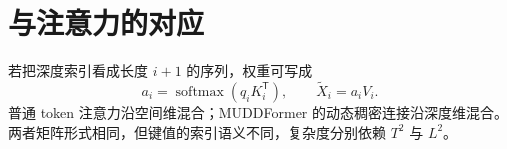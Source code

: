 \documentclass[11pt]{article}
\numberwithin{equation}{section}
\newcommand{\1}{\mathbf{1}}
\newcommand{\T}{\mathsf{T}}
\newcommand{\softmax}{\operatorname{softmax}}
\begin{document}
\section{与注意力的对应}
若把深度索引看成长度 $i+1$ 的序列，权重可写成
\begin{equation}
  a_i=\softmax(q_iK_i^{\T}),\qquad
  \tilde X_i=a_iV_i.
\end{equation}
普通 token 注意力沿空间维混合；MUDDFormer 的动态稠密连接沿深度维混合。两者矩阵形式相同，但键值的索引语义不同，复杂度分别依赖 $T^2$ 与 $L^2$。
\end{document}
